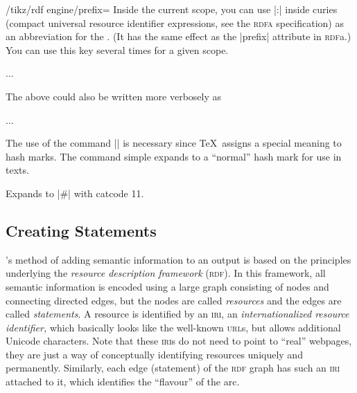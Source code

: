 \begin{key}{/tikz/rdf engine/prefix=}
  Inside the current scope, you can use |:| inside
  curies (compact universal resource identifier expressions, see the
  \textsc{rdfa} specification) as an abbreviation for the
  . (It has the same effect as the |prefix| attribute in
  \textsc{rdf}a.) You can use this key several times for a given scope.
\begin{codeexample}
\scoped [rdf engine = {
  prefix = {rdf: http://www.w3.org/1999/02/22-rdf-syntax-ns\tikzrdfhashmark},
  prefix = {automata: http://www.tcs.uni-luebeck.de/ontologies/2016/04/28/automata/},
  statement = { ..., predicate = rdf:type, object = automata:state },
  statement = { ..., predicate = rdf:type, object = automata:final },
  }] ...
\end{codeexample}
  The above could also be written more verbosely as
\begin{codeexample}
\scoped [rdf engine = {
  statement = { ...,
    predicate = http://www.w3.org/1999/02/22-rdf-syntax-ns\tikzrdfhashmark type, 
    object = http://www.tcs.uni-luebeck.de/ontologies/2016/04/28/automata/state }
  },
  statement = { ...,
    predicate = http://www.w3.org/1999/02/22-rdf-syntax-ns\tikzrdfhashmark type, 
    object = http://www.tcs.uni-luebeck.de/ontologies/2016/04/28/automata/final }
  }] ...
\end{codeexample}

  The use of the command |\tikzrdfhashmark| is necessary since \TeX\
  assigns a special meaning to hash marks. The command simple expands
  to a ``normal'' hash mark for use in texts.
  \begin{command}{\tikzrdfhashmark}
    Expands to |#| with catcode 11.    
  \end{command}
\end{key}



\subsection{Creating Statements}

\tikzname's method of adding semantic information to an output is
based on the principles underlying the \emph{resource description
  framework} (\textsc{rdf}). In this framework, all semantic
information is encoded using a large graph consisting of nodes
and connecting directed edges, but the nodes are called
\emph{resources} and the edges are called \emph{statements}. A
resource is identified by an \textsc{iri}, an \emph{internationalized 
  resource identifier,} which basically looks like the well-known
\textsc{url}s, but allows additional Unicode characters. Note that
these \textsc{iri}s do not need to point to ``real'' webpages, they
are just a way of conceptually identifying resources uniquely and
permanently. Similarly, each edge (statement) of the \textsc{rdf}
graph has such an \textsc{iri} attached to it, which identifies the
``flavour'' of the arc.

